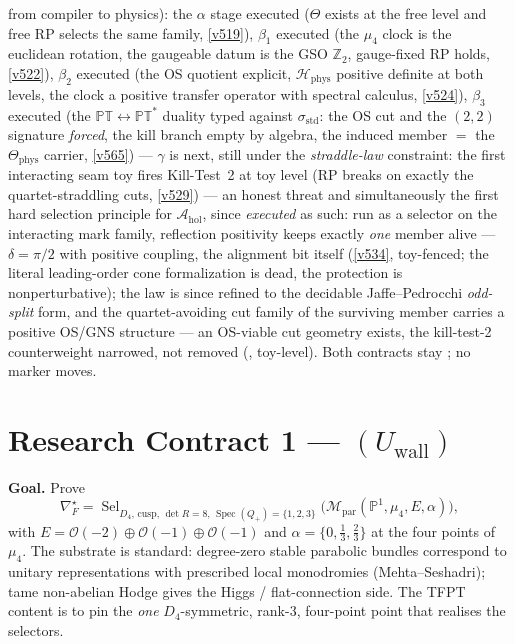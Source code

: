 \documentclass[11pt,a4paper]{article}
\newcommand{\PP}{\mathbb P^1}
\newcommand{\Z}{\mathbb Z}
\begin{document}
\begin{keybox}
from compiler to physics): the $\alpha$ stage executed ($\Theta$ exists at the free level and
free RP selects the same family, \vref{v519}), $\beta_1$ executed (the $\mu_4$ clock is the
euclidean rotation, the gaugeable datum is the GSO $\Z_2$, gauge-fixed RP holds, \vref{v522}),
$\beta_2$ executed (the OS quotient explicit, $\mathcal H_{\mathrm{phys}}$ positive definite at
both levels, the clock a positive transfer operator with spectral calculus, \vref{v524}),
$\beta_3$ executed (the $\mathbb{PT}\leftrightarrow\mathbb{PT}^*$ duality typed against
$\sigma_{\mathrm{std}}$: the OS cut and the $(2,2)$ signature \emph{forced}, the kill branch
empty by algebra, the induced member $=$ the $\Theta_{\mathrm{phys}}$ carrier, \vref{v565}) ---
$\gamma$ is next, still under the \emph{straddle-law} constraint: the first interacting seam toy
fires Kill-Test~2 at toy level (RP breaks on exactly the quartet-straddling cuts,
\vref{v529}) --- an honest threat and simultaneously the first hard selection principle for
$\mathcal A_{\mathrm{hol}}$, since \emph{executed} as such: run as a selector on the interacting
mark family, reflection positivity keeps exactly \emph{one} member alive --- $\delta=\pi/2$ with
positive coupling, the alignment bit itself (\vref{v534}, toy-fenced; the literal leading-order
cone formalization is dead, the protection is nonperturbative); the law is since refined to the
decidable Jaffe--Pedrocchi \emph{odd-split} form, and the quartet-avoiding cut family of the
surviving member carries a positive OS/GNS structure --- an OS-viable cut geometry exists, the
kill-test-2 counterweight narrowed, not removed
(, toy-level). Both contracts stay \mO; no
marker moves.
\end{keybox}

\section*{Research Contract 1 --- $(U_{\mathrm{wall}})$}
\noindent\textbf{Goal.} Prove
\[
  \nabla_F^\star=\operatorname{Sel}_{D_4,\,\mathrm{cusp},\,\det R=8,\,\operatorname{Spec}(Q_+)=\{1,2,3\}}
  \bigl(\mathcal M_{\mathrm{par}}(\PP,\mu_4,E,\alpha)\bigr),
\]
with $E=\mathcal O(-2)\oplus\mathcal O(-1)\oplus\mathcal O(-1)$ and $\alpha=\{0,\tfrac13,\tfrac23\}$ at the
four points of $\mu_4$. The substrate is standard: degree-zero stable parabolic bundles correspond to
unitary representations with prescribed local monodromies (Mehta--Seshadri); tame non-abelian Hodge gives
the Higgs / flat-connection side. The TFPT content is to pin the \emph{one} $D_4$-symmetric, rank-3,
four-point point that realises the selectors.
\end{document}
